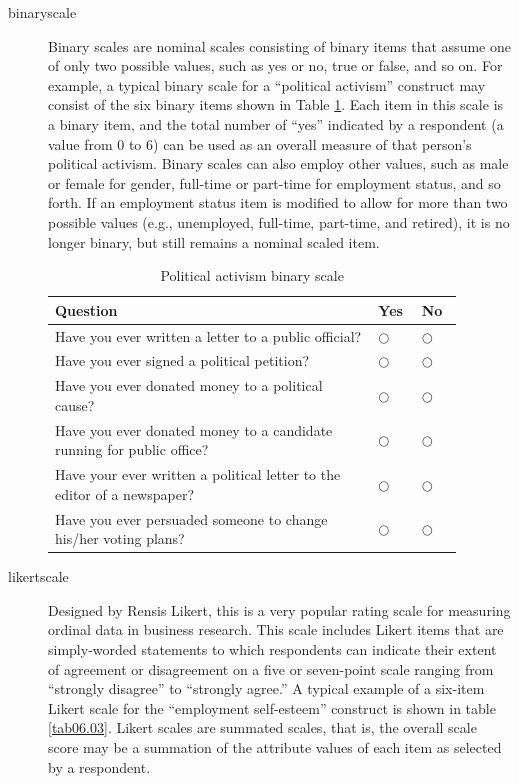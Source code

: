 \begin{description}
	\item[\Gls{binaryscale}] Binary scales are nominal scales consisting of binary items that assume one of only two possible values, such as yes or no, true or false, and so on. For example, a typical binary scale for a ``political activism'' construct may consist of the six binary items shown in Table \ref{tab06.02}. Each item in this scale is a binary item, and the total number of ``yes'' indicated by a respondent (a value from $ 0 $ to $ 6 $) can be used as an overall measure of that person's political activism. Binary scales can also employ other values, such as male or female for gender, full-time or part-time for employment status, and so forth. If an employment status item is modified to allow for more than two possible values (e.g., unemployed, full-time, part-time, and retired), it is no longer binary, but still remains a nominal scaled item.
	
	\begin{table}[H]
		\centering
		\begin{tabularx}{0.95\linewidth}{p{0.70\linewidth}p{0.09\linewidth}p{0.09\linewidth}}
			\toprule
			\textbf{Question} & \textbf{Yes} & \textbf{No} \\
			\midrule
			Have you ever written a letter to a public official? & $ \bigcirc $ & $ \bigcirc $ \\ 
			Have you ever signed a political petition? & $ \bigcirc $ & $ \bigcirc $ \\ 
			Have you ever donated money to a political cause? & $ \bigcirc $ & $ \bigcirc $ \\ 
			Have you ever donated money to a candidate running for public office? & $ \bigcirc $ & $ \bigcirc $ \\ 
			Have your ever written a political letter to the editor of a newspaper?& $ \bigcirc $ & $ \bigcirc $ \\ 
			Have you ever persuaded someone to change his/her voting plans? & $ \bigcirc $ & $ \bigcirc $ \\ 
			\bottomrule
		\end{tabularx}
		\caption{Political activism binary scale}
		\label{tab06.02}
	\end{table}
	
	\item[\Gls{likertscale}] Designed by Rensis Likert, this is a very popular rating scale for measuring ordinal data in business research. This scale includes Likert items that are simply-worded statements to which respondents can indicate their extent of agreement or disagreement on a five or seven-point scale ranging from ``strongly disagree'' to ``strongly agree.'' A typical example of a six-item Likert scale for the ``employment self-esteem'' construct is shown in table \ref{tab06.03}. Likert scales are summated scales, that is, the overall scale score may be a summation of the attribute values of each item as selected by a respondent.
	

\end{description}

